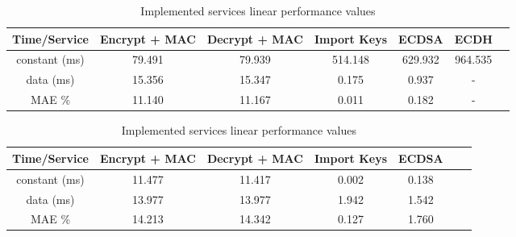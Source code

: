 \begin{table}[]
\centering
\def\arraystretch{1.5}
\begin{tabular}{|c|c|c|c|c|c|c|}
\hline
Time/Service   & Encrypt + MAC	  & Decrypt + MAC  & Import Keys & ECDSA & ECDH   \\ \hline
	constant (ms) & 79.491 & 79.939 & 514.148  & 629.932 & 964.535 \\ \hline
	data (ms) & 15.356 & 15.347 & 0.175 & 0.937 & - \\ \hline
	MAE \%	   & 11.140 & 11.167 & 0.011 & 0.182 & - \\ \hline
\end{tabular}
\caption{Implemented services linear performance values}
\label{tab:services-model}
\end{table}

\begin{table}[]
\centering
\def\arraystretch{1.5}
\begin{tabular}{|c|c|c|c|c|c|c|}
\hline
Time/Service   & Encrypt + MAC	  & Decrypt + MAC  & Import Keys & ECDSA   \\ \hline
	constant (ms) & 11.477 & 11.417 & 0.002 & 0.138 \\ \hline
	data (ms) & 13.977 & 13.977 & 1.942 & 1.542 \\ \hline
	MAE \%	   & 14.213 & 14.342 & 0.127 & 1.760 \\ \hline
\end{tabular}
\caption{Implemented services linear performance values}
\label{tab:services-model}
\end{table}
